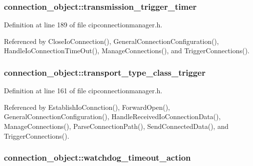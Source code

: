 \hypertarget{structconnection__object_a8ff49ae39efff1f6e82d66bca01f995b}{
\subsubsection[{transmission\-\_\-trigger\-\_\-timer}]{ {\bf connection\-\_\-object\-::transmission\-\_\-trigger\-\_\-timer}}}\label{d1/d48/structconnection__object_a8ff49ae39efff1f6e82d66bca01f995b}


\-Definition at line 189 of file cipconnectionmanager.\-h.



\-Referenced by \-Close\-Io\-Connection(), \-General\-Connection\-Configuration(), \-Handle\-Io\-Connection\-Time\-Out(), \-Manage\-Connections(), and \-Trigger\-Connections().

\hypertarget{structconnection__object_aee393bffe6bd92fb313db48832665254}{
\subsubsection[{transport\-\_\-type\-\_\-class\-\_\-trigger}]{ {\bf connection\-\_\-object\-::transport\-\_\-type\-\_\-class\-\_\-trigger}}}\label{d1/d48/structconnection__object_aee393bffe6bd92fb313db48832665254}


\-Definition at line 161 of file cipconnectionmanager.\-h.



\-Referenced by \-Establish\-Io\-Connction(), \-Forward\-Open(), \-General\-Connection\-Configuration(), \-Handle\-Received\-Io\-Connection\-Data(), \-Manage\-Connections(), \-Parse\-Connection\-Path(), \-Send\-Connected\-Data(), and \-Trigger\-Connections().

\hypertarget{structconnection__object_a8585f871d912a74c4de0a0c3e1601843}{
\subsubsection[{watchdog\-\_\-timeout\-\_\-action}]{ {\bf connection\-\_\-object\-::watchdog\-\_\-timeout\-\_\-action}}}\label{d1/d48/structconnection__object_a8585f871d912a74c4de0a0c3e1601843}


